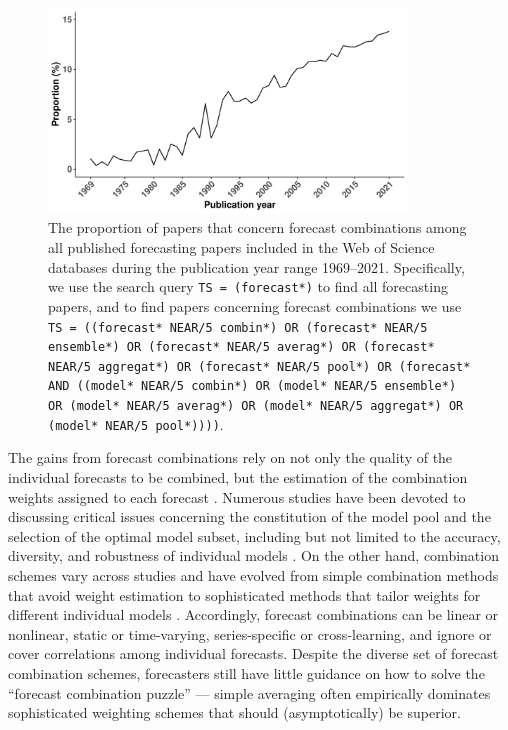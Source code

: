 \documentclass[a4paper,11pt]{article}
\begin{document}
\begin{figure}[!htb]
  \centering \includegraphics[width=0.85\textwidth]{prop}
  \caption{The proportion of papers that concern forecast combinations among all published forecasting papers included in the Web of Science databases during the publication year range 1969--2021. Specifically, we use the search query \texttt{TS = (forecast*)} to find all forecasting papers, and to find papers concerning forecast combinations we use \texttt{TS = ((forecast* NEAR/5 combin*) OR (forecast* NEAR/5 ensemble*) OR (forecast* NEAR/5 averag*) OR (forecast* NEAR/5 aggregat*) OR (forecast* NEAR/5 pool*) OR (forecast* AND ((model* NEAR/5 combin*) OR (model* NEAR/5 ensemble*) OR (model* NEAR/5 averag*) OR (model* NEAR/5 aggregat*) OR (model* NEAR/5 pool*))))}.}
  \label{fig:prop}
\end{figure}

The gains from forecast combinations rely on not only the quality of the individual forecasts to be combined, but the estimation of the combination weights assigned to each forecast \citep{Timmermann2006-en,Cang2014-tp}. Numerous studies have been devoted to discussing critical issues concerning the constitution of the model pool and the selection of the optimal model subset, including but not limited to the accuracy, diversity, and robustness of individual models \citep{Batchelor1995-ps,Mannes2014-dl,Thomson2019-al,Lichtendahl2020-ut,Kang2021-ol}. On the other hand, combination schemes vary across studies and have evolved from simple combination methods that avoid weight estimation \citep[e.g.,][]{Clemen1986-pd,Palm1992-im,Genre2013-ut,Grushka-Cockayne2017-dj,Petropoulos2020-fp} to sophisticated methods that tailor weights for different individual models \citep[e.g.,][]{Bates1969-yj,Newbold1974-lp,Kolassa2011-ai,Li2020-od,Montero-Manso2020-tq,Kang2021-ol,Wang2021-un}. Accordingly, forecast combinations can be linear or nonlinear, static or time-varying, series-specific or cross-learning, and ignore or cover correlations among individual forecasts. Despite the diverse set of forecast combination schemes, forecasters still have little guidance on how to solve the ``forecast combination puzzle'' \citep{Stock2004-rq,Smith2009-wd,Claeskens2016-pv,Chan2018-jl} --- simple averaging often empirically dominates sophisticated weighting schemes that should (asymptotically) be superior.
\end{document}
